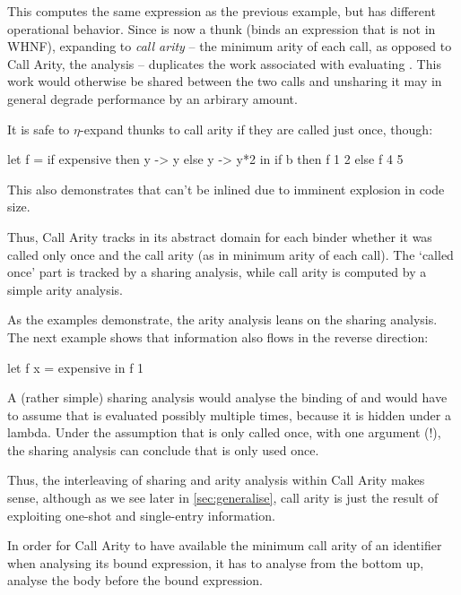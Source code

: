 This computes the same expression as the previous example, but has different operational behavior.
Since  is now a thunk (\eg binds an expression that is not in WHNF), expanding  to \emph{call arity} -- the minimum arity of each call, as opposed to Call Arity, the analysis -- duplicates the work associated with evaluating . 
This work would otherwise be shared between the two calls and unsharing it may in general degrade performance by an arbirary amount.

It is safe to $\eta$-expand thunks to call arity if they are called just once, though:
\begin{haskellcode}
  let f =
        if expensive
        then \x y -> y
        else \x y -> y*2
  in if b then f 1 2 else f 4 5
\end{haskellcode}

This also demonstrates that  can't be inlined due to imminent explosion in code size.

Thus, Call Arity tracks in its abstract domain for each binder whether it was called only once and the call arity (as in minimum arity of each call).
The `called once' part is tracked by a sharing analysis, while call arity is computed by a simple arity analysis.

As the examples demonstrate, the arity analysis leans on the sharing analysis.
The next example shows that information also flows in the reverse direction:
\begin{haskellcode}
  let f x = expensive
  in f 1
\end{haskellcode}

A (rather simple) sharing analysis would analyse the binding of  and would have to assume that  is evaluated possibly multiple times, because it is hidden under a lambda.
Under the assumption that  is only called once, with one argument (!), the sharing analysis can conclude that  is only used once.

Thus, the interleaving of sharing and arity analysis within Call Arity makes sense, although as we see later in \cref{sec:generalise}, call arity is just the result of exploiting one-shot and single-entry information.\smallskip

In order for Call Arity to have available the minimum call arity of an identifier when analysing its bound expression, it has to analyse  from the bottom up, \eg analyse the body before the bound expression.

